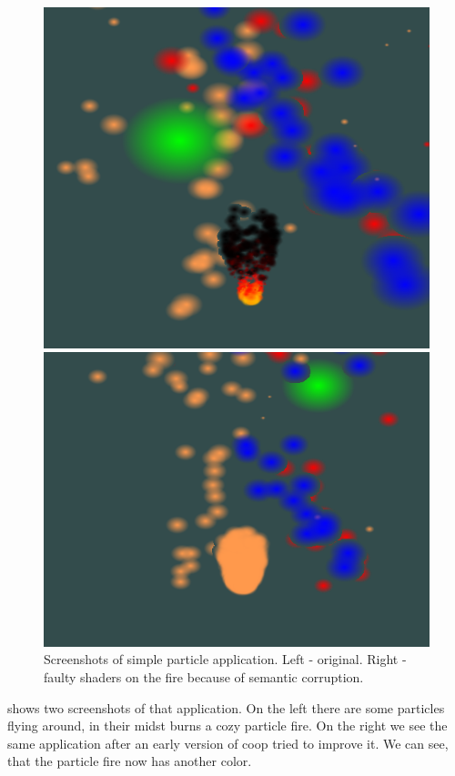 \begin{figure}[ht]
	\begin{minipage}[b]{0.5\linewidth}
		\centering
		\includegraphics[width=\textwidth,height=.7\textwidth]{PICs/particles}
	\end{minipage}
	\hspace{0.5cm}
	\begin{minipage}[b]{0.5\linewidth}
		\centering
		\includegraphics[width=\textwidth,height=.7\textwidth]{PICs/particles_faulty}
	\end{minipage}
\caption{Screenshots of simple particle application. Left - original. Right - faulty shaders on the fire because of semantic corruption.}\label{particles_faulty}
\end{figure}
 shows two screenshots of that application. On the left there are some particles flying around, in their midst burns a cozy particle fire. On the right we see the same application after an early version of coop tried to improve it. We can see, that the particle fire now has another color.\\
